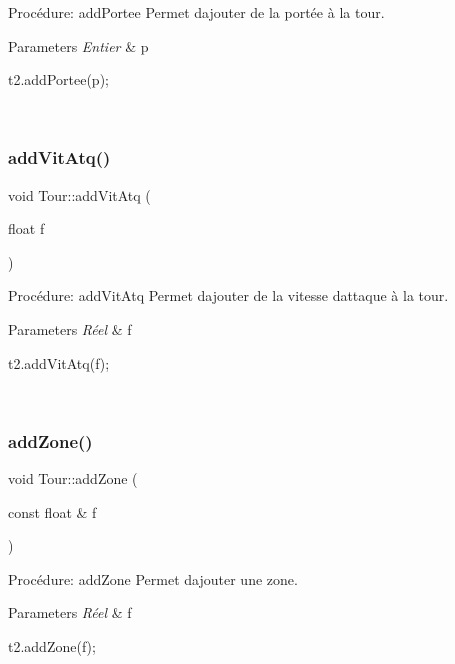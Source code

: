 Procédure\+: add\+Portee Permet d\textquotesingle{}ajouter de la portée à la tour. 


\begin{DoxyParams}{Parameters}
{\em Entier} & p 
\begin{DoxyCode}
t2.addPortee(p);
\end{DoxyCode}
 \\
\hline
\end{DoxyParams}
\mbox{\label{classTour_a954d1151a9fbc182adde53b28fc7cc26}} 
\subsubsection{\texorpdfstring{add\+Vit\+Atq()}{addVitAtq()}}
{\footnotesize\ttfamily void Tour\+::add\+Vit\+Atq (\begin{DoxyParamCaption}\item[{float}]{f }\end{DoxyParamCaption})}



Procédure\+: add\+Vit\+Atq Permet d\textquotesingle{}ajouter de la vitesse d\textquotesingle{}attaque à la tour. 


\begin{DoxyParams}{Parameters}
{\em Réel} & f 
\begin{DoxyCode}
t2.addVitAtq(f);
\end{DoxyCode}
 \\
\hline
\end{DoxyParams}
\mbox{\label{classTour_a6c3050640d16281913269f73af884ad6}} 
\subsubsection{\texorpdfstring{add\+Zone()}{addZone()}}
{\footnotesize\ttfamily void Tour\+::add\+Zone (\begin{DoxyParamCaption}\item[{const float \&}]{f }\end{DoxyParamCaption})}



Procédure\+: add\+Zone Permet d\textquotesingle{}ajouter une zone. 


\begin{DoxyParams}{Parameters}
{\em Réel} & f 
\begin{DoxyCode}
t2.addZone(f);
\end{DoxyCode}
 \\
\hline
\end{DoxyParams}
\mbox{\label{classTour_a418908de2fcbb83e8e9459a999f98aa6}} 
